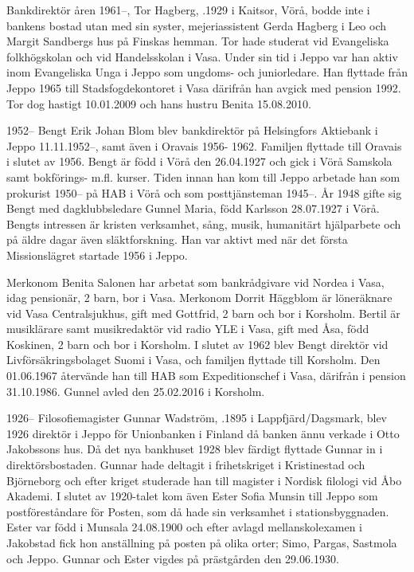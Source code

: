 Bankdirektör åren 1961--, Tor Hagberg, .1929 i Kaitsor, Vörå, bodde inte i bankens bostad utan med sin syster, mejeriassistent Gerda Hagberg i Leo och Margit Sandbergs hus på Finskas hemman. Tor hade studerat vid Evangeliska folkhögskolan och vid Handelsskolan i Vasa. Under sin tid i Jeppo var han aktiv inom Evangeliska Unga i	Jeppo som ungdoms- och juniorledare. Han flyttade från Jeppo 1965 till Stadsfogdekontoret i Vasa därifrån han avgick med pension 1992. Tor dog hastigt 10.01.2009 och hans hustru Benita 15.08.2010.


1952--
Bengt Erik Johan Blom blev bankdirektör på Helsingfors Aktiebank i Jeppo 11.11.1952--, samt även i Oravais 1956-		1962. Familjen flyttade till Oravais i slutet av 1956. Bengt är född i Vörå den 26.04.1927 och gick i Vörå Samskola samt bokförings- m.fl. kurser. Tiden innan han kom till Jeppo arbetade han som prokurist 1950-- på HAB i Vörå och som posttjänsteman 1945--. År 1948 gifte sig Bengt med dagklubbsledare Gunnel Maria, född Karlsson 28.07.1927 i Vörå. Bengts intressen är kristen verksamhet, sång, musik, humanitärt hjälparbete och på äldre dagar även släktforskning. Han var aktivt med när det första Missionslägret startade 1956 i Jeppo.
\begin{jhchildren}
  \item {}
  \item {}
  \item {}
\end{jhchildren}
Merkonom Benita Salonen har arbetat som bankrådgivare vid Nordea i Vasa, idag pensionär, 2 barn, bor i Vasa. Merkonom Dorrit Häggblom är löneräknare vid Vasa Centralsjukhus, gift med Gottfrid, 2 barn och bor i Korsholm. Bertil är musiklärare samt musikredaktör vid radio YLE i Vasa, gift med Åsa, född Koskinen, 2 barn och bor i Korsholm. I slutet av 1962 blev Bengt direktör vid Livförsäkringsbolaget Suomi i Vasa, och familjen flyttade till Korsholm. Den 01.06.1967 återvände han till HAB som Expeditionschef i Vasa, därifrån i pension  31.10.1986. Gunnel avled den 25.02.2016 i Korsholm.


1926--
Filosofiemagister Gunnar Wadström, .1895 i Lappfjärd/Dagsmark, blev 1926 direktör i Jeppo för 		Unionbanken i Finland då banken ännu verkade i Otto Jakobssons hus. Då det nya bankhuset 1928 blev färdigt flyttade Gunnar in i direktörsbostaden. Gunnar hade deltagit i frihetskriget i Kristinestad och Björneborg och efter kriget 		studerade han till magister i Nordisk filologi vid Åbo Akademi. I slutet av 1920-talet kom även Ester Sofia Munsin till Jeppo som postföreståndare för Posten, som då hade sin verksamhet i stationsbyggnaden. Ester var född i Munsala 24.08.1900 och efter avlagd mellanskolexamen i Jakobstad fick hon anställning på posten på olika orter; Simo, Pargas, Sastmola och Jeppo. Gunnar och Ester vigdes på prästgården den 29.06.1930.

